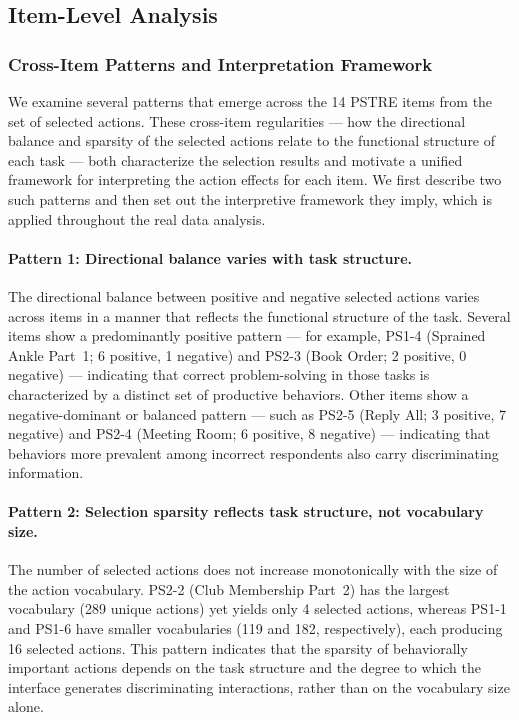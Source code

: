 \subsection{Item-Level Analysis}

\subsubsection{Cross-Item Patterns and Interpretation Framework}

We examine several patterns that emerge across the 14 PSTRE items from the set of selected actions. These cross-item regularities --- how the directional balance and sparsity of the selected actions relate to the functional structure of each task --- both characterize the selection results and motivate a unified framework for interpreting the action effects for each item. We first describe two such patterns and then set out the interpretive framework they imply, which is applied throughout the real data analysis.

\paragraph*{Pattern 1: Directional balance varies with task structure.}
The directional balance between positive and negative selected actions varies across items in a manner that reflects the functional structure of the task. Several items show a predominantly positive pattern --- for example, PS1-4 (Sprained Ankle Part~1; 6 positive, 1 negative) and PS2-3 (Book Order; 2 positive, 0 negative) --- indicating that correct problem-solving in those tasks is characterized by a distinct set of productive behaviors. Other items show a negative-dominant or balanced pattern --- such as PS2-5 (Reply All; 3 positive, 7 negative) and PS2-4 (Meeting Room; 6 positive, 8 negative) --- indicating that behaviors more prevalent among incorrect respondents also carry discriminating information.

\paragraph*{Pattern 2: Selection sparsity reflects task structure, not vocabulary size.}
The number of selected actions does not increase monotonically with the size of the action vocabulary. PS2-2 (Club Membership Part~2) has the largest vocabulary (289 unique actions) yet yields only 4 selected actions, whereas PS1-1 and PS1-6 have smaller vocabularies (119 and 182, respectively), each producing 16 selected actions. This pattern indicates that the sparsity of behaviorally important actions depends on the task structure and the degree to which the interface generates discriminating interactions, rather than on the vocabulary size alone.

